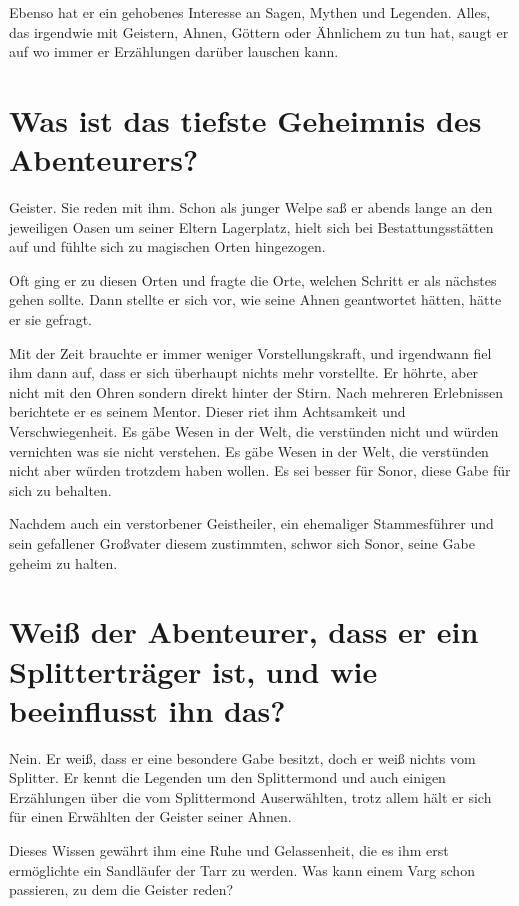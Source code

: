 \documentclass{article}
\begin{document}
	Ebenso hat er ein gehobenes Interesse an Sagen, Mythen und Legenden.
	Alles, das irgendwie mit Geistern, Ahnen, Göttern oder Ähnlichem zu tun
	hat, saugt er auf wo immer er Erzählungen darüber lauschen kann.


	\section[Top Secret]{Was ist das tiefste Geheimnis des Abenteurers?}
	

	Geister. Sie reden mit ihm. Schon als junger Welpe saß er abends lange
	an den jeweiligen Oasen um seiner Eltern Lagerplatz, hielt sich bei
	Bestattungsstätten auf und fühlte sich zu magischen Orten hingezogen.

	Oft ging er zu diesen Orten und fragte die Orte, welchen Schritt er als
	nächstes gehen sollte. Dann stellte er sich vor, wie seine Ahnen
	geantwortet hätten, hätte er sie gefragt.

	Mit der Zeit brauchte er immer weniger Vorstellungskraft, und irgendwann
	fiel ihm dann auf, dass er sich überhaupt nichts mehr vorstellte. Er
	höhrte, aber nicht mit den Ohren sondern direkt hinter der Stirn.
	Nach mehreren Erlebnissen berichtete er es seinem Mentor. Dieser riet
	ihm Achtsamkeit und Verschwiegenheit. Es gäbe Wesen in der Welt,
	die verstünden nicht und würden vernichten was sie nicht verstehen. Es
	gäbe Wesen in der Welt, die verstünden nicht aber würden trotzdem haben
	wollen. Es sei besser für Sonor, diese Gabe für sich zu behalten.

	Nachdem auch ein verstorbener Geistheiler, ein ehemaliger Stammesführer
	und sein gefallener Großvater diesem zustimmten, schwor sich Sonor,
	seine Gabe geheim zu halten.


	\section[Splitter]{Weiß der Abenteurer, dass er ein Splitterträger ist, und wie beeinflusst ihn das?}


	Nein. Er weiß, dass er eine besondere Gabe besitzt, doch er weiß nichts
	vom Splitter. Er kennt die Legenden um den Splittermond und auch einigen
	Erzählungen über die vom Splittermond Auserwählten, trotz allem hält er
	sich für einen Erwählten der Geister seiner Ahnen.

	Dieses Wissen gewährt ihm eine Ruhe und Gelassenheit, die es ihm erst
	ermöglichte ein Sandläufer der Tarr zu werden.
	Was kann einem Varg schon passieren, zu dem die Geister reden?
\end{document}
